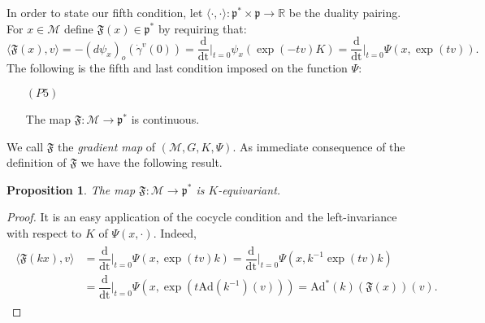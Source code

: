 \documentclass[leqno,11pt, a4]{amsart}
\newtheorem{prop}[equation]{Proposition}
\theoremstyle{named}
\begin{document}
In order to state our fifth condition, let ${{\langle} \cdot , \cdot {\rangle}} : {\mathfrak{p}}^*\times {\mathfrak{p}} {\rightarrow} {\mathbb{R}}$ be the duality pairing.
For $x\in {\mathscr{M}}$ define ${\mathfrak{F}}(x) \in {\mathfrak{p}}^*$
by requiring that:
\begin{equation}\label{momento-astratto}
  {\langle} {\mathfrak{F}} (x), {{v}}{\rangle} = -  (d \psi_x )_{o}({\dot{\gamma}}^{{v}}(0))  = {{\dfrac {\mathrm {d}  }{\mathrm {dt}}} \vert _{t=0} } \psi_x( \exp(-t{{v}}) K)  = {{\dfrac {\mathrm {d}  }{\mathrm {dt}}} \vert _{t=0} } \Psi(x,
    \exp(t{{v}})) .\nonumber
\end{equation}
The following is the fifth and last condition
  imposed on the function $\Psi$:
  \begin{enumerate}
    \item[$(P5)$]
    
    The map ${\mathfrak{F}} : {\mathscr{M}} {\rightarrow} {\mathfrak{p}}^*$ is continuous.
  \end{enumerate}

  We call ${\mathfrak{F}}$ the \emph{gradient map} of $({\mathscr{M}}, G, K, \Psi).$ As immediate consequence of the definition of ${\mathfrak{F}}$ we have the following result.
   \begin{prop}\label{equivarianza}
  The map ${\mathfrak{F}} : {\mathscr{M}} {\rightarrow} {\mathfrak{p}}^*$ is $K$-equivariant.
\end{prop}
\begin{proof}
  It is an easy application of the cocycle condition and the
  left-invariance with respect to $K$ of $\Psi(x,\cdot)$. Indeed,
  \begin{gather*}
    \begin{split}
      {\langle} {\mathfrak{F}} (kx),{{v}} {\rangle} &={{\dfrac {\mathrm {d}  }{\mathrm {dt}}} \vert _{t=0} } \Psi (x, \exp(t{{v}})k)={{\dfrac {\mathrm {d}  }{\mathrm {dt}}} \vert _{t=0} } \Psi
      (x,k^{-1} \exp(t{{v}}) k)\\
      &={{\dfrac {\mathrm {d}  }{\mathrm {dt}}} \vert _{t=0} } \Psi\left (x,\exp(t\mathrm{Ad}(k^{-1})({{v}}))\right
      )=\mathrm{Ad}^* (k) ( {\mathfrak{F}} (x))({{v}}) .
    \end{split}
  \end{gather*}
\end{proof}
\end{document}
